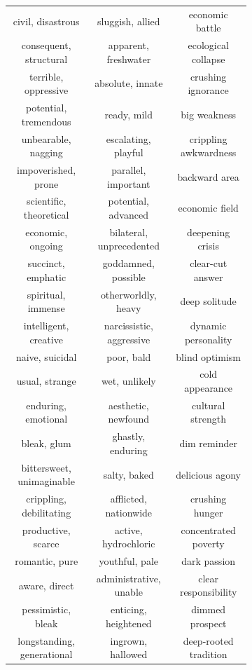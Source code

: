 \documentclass[9pt,twocolumn,twoside,lineno]{pnas-new}
\begin{document}
\begin{figure}
\begin{subfigure}{0.3\textwidth}
\begin{center}
\begin{tabular}{ c | c | c  }
			\tiny civil, disastrous & \tiny sluggish, allied & \tiny economic battle\\
			\tiny consequent, structural & \tiny apparent, freshwater & \tiny ecological collapse\\
			\tiny terrible, oppressive & \tiny absolute, innate & \tiny crushing ignorance\\
			\tiny potential, tremendous & \tiny ready, mild & \tiny big weakness\\
			\tiny unbearable, nagging & \tiny escalating, playful & \tiny crippling awkwardness\\
			\tiny impoverished, prone & \tiny parallel, important & \tiny backward area\\
			\tiny scientific, theoretical & \tiny potential, advanced & \tiny economic field\\
			\tiny economic, ongoing & \tiny bilateral, unprecedented & \tiny deepening crisis\\
			\tiny succinct, emphatic & \tiny goddamned, possible & \tiny clear-cut answer\\
			\tiny spiritual, immense & \tiny otherworldly, heavy & \tiny deep solitude\\
			\tiny intelligent, creative & \tiny narcissistic, aggressive & \tiny dynamic personality\\
			\tiny naive, suicidal & \tiny poor, bald & \tiny blind optimism\\
			\tiny usual, strange & \tiny wet, unlikely & \tiny cold appearance\\
			\tiny enduring, emotional & \tiny aesthetic, newfound & \tiny cultural strength\\
			\tiny bleak, glum & \tiny ghastly, enduring & \tiny dim reminder\\
			\tiny bittersweet, unimaginable & \tiny salty, baked & \tiny delicious agony\\
			\tiny crippling, debilitating & \tiny afflicted, nationwide & \tiny crushing hunger\\
			\tiny productive, scarce & \tiny active, hydrochloric & \tiny concentrated poverty\\
			\tiny romantic, pure & \tiny youthful, pale & \tiny dark passion\\
			\tiny aware, direct & \tiny administrative, unable & \tiny clear responsibility\\
			\tiny pessimistic, bleak & \tiny enticing, heightened & \tiny dimmed prospect\\
			\tiny longstanding, generational & \tiny ingrown, hallowed & \tiny deep-rooted tradition\\

\end{tabular}
\end{center}
\end{subfigure}
\end{figure}
\end{document}

